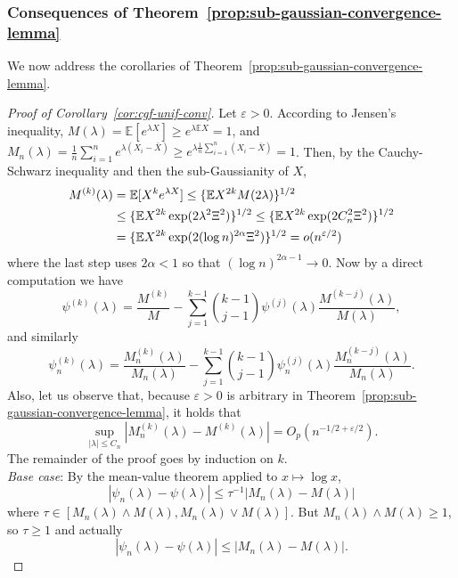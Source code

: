 \documentclass{article}
\theoremstyle{definition}
\newcommand*\eps{\epsilon}
\renewcommand*\epsilon{\varepsilon}
\newcommand{\E}{\mathbb{E}}
\newcommand{\1}{\mathbbm{1}}
\begin{document}
\subsubsection{Consequences of Theorem~\ref{prop:sub-gaussian-convergence-lemma}}
We now address the corollaries of Theorem~\ref{prop:sub-gaussian-convergence-lemma}.
\begin{proof}[Proof of Corollary~\ref{cor:cgf-unif-conv}]
    Let $\eps > 0$. According to Jensen's inequality, $M(\lambda) = \E[e^{\lambda X}] \geq e^{\lambda \E X} = 1$, and $M_n(\lambda) = \frac1n \sum_{i=1}^n e^{\lambda (X_i - \bar X)} \geq e^{\lambda \frac1n\sum_{i=1}^n (X_i - \bar X)} = 1$. Then, by the Cauchy-Schwarz inequality and then the sub-Gaussianity of $X$,
    \begin{align}
        M^{(k)}(\lambda) &= \E[X^ke^{\lambda X}] \leq \{\E X^{2k} M(2\lambda)\}^{1/2} \notag\\ &\leq \{\E X^{2k} \exp(2\lambda^2\Xi^2)\}^{1/2} \leq  \{\E X^{2k} \exp(2C_n^2\Xi^2)\}^{1/2}\notag \\
        &= \{\E X^{2k} \exp(2(\log n)^{2\alpha}\Xi^2)\}^{1/2} = o(n^{\eps/2})
        \label{eqn:M-k-ineq}
    \end{align}
    where the last step uses $2\alpha < 1$ so that $(\log n)^{2\alpha - 1} \to 0$. Now by a direct computation we have 
    \[
    \psi^{(k)}(\lambda) = \frac{M^{(k)}}{M} - \sum_{j = 1}^{k-1} {k - 1 \choose j- 1} \psi^{(j)}(\lambda)\frac{M^{(k - j)}(\lambda)}{M(\lambda)},
    \]
    and similarly
    \[
    \psi^{(k)}_n(\lambda) = \frac{M^{(k)}_n(\lambda)}{M_n(\lambda)} - \sum_{j = 1}^{k-1} {k - 1 \choose j- 1} \psi^{(j)}_n(\lambda)\frac{M^{(k - j)}_n(\lambda)}{M_n(\lambda)}.
    \]
    Also, let us observe that, because $\eps > 0$ is arbitrary in Theorem~\ref{prop:sub-gaussian-convergence-lemma}, it holds that 
    \begin{equation}
        \sup_{|\lambda| \leq C_n} |M_n^{(k)}(\lambda) - M^{(k)}(\lambda)| = O_p(n^{-1/2 + \eps/2}).
        \label{eqn:sub-gaussian-convergence-app}
    \end{equation}
    The remainder of the proof goes by induction on $k$. \\
    \textit{Base case}: By the mean-value theorem applied to $x \mapsto \log x$, 
    \[
    |\psi_n(\lambda) - \psi(\lambda)| \leq \tau^{-1}|M_n(\lambda) - M(\lambda)|
    \]
    where $\tau \in [M_n(\lambda) \wedge M(\lambda), M_n(\lambda) \vee M(\lambda)]$. But $M_n(\lambda) \wedge M(\lambda) \geq 1$, so $\tau \geq 1$ and actually \[
    |\psi_n(\lambda) - \psi(\lambda)| \leq |M_n(\lambda) - M(\lambda)|.
\]
\end{proof}
\end{document}
